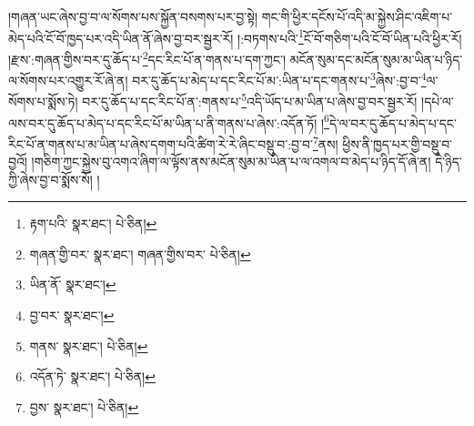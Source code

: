 །གཞན་ཡང་ཞེས་བྱ་བ་ལ་སོགས་པས་སྐྱོན་བསགས་པར་བྱ་སྟེ། གང་གི་ཕྱིར་དངོས་པོ་འདི་མ་སྐྱེས་ཤིང་འཇིག་པ་མེད་པའི་ངོ་བོ་ཁྱད་པར་འདི་ཡིན་ནོ་ཞེས་བྱ་བར་སྦྱར་རོ། །:བཏགས་པའི་\footnote{རྟག་པའི་  སྣར་ཐང་།  པེ་ཅིན། }ངོ་བོ་གཅིག་པའི་ངོ་བོ་ཡིན་པའི་ཕྱིར་རོ། །རྫས་:གཞན་གྱིས་བར་དུ་ཆོད་པ་\footnote{གཞན་གྱི་བར་  སྣར་ཐང་། གཞན་གྱིས་བར་  པེ་ཅིན། }དང་རིང་པོ་ན་གནས་པ་དག་ཀྱང་། མངོན་སུམ་དང་མངོན་སུམ་མ་ཡིན་པ་ཉིད་ལ་སོགས་པར་འགྱུར་རོ་ཞེ་ན། བར་དུ་ཆོད་པ་མེད་པ་དང་རིང་པོ་མ་:ཡིན་པ་དང་གནས་པ་\footnote{ཡིན་ནོ་  སྣར་ཐང་། }ཞེས་:བྱ་བ་\footnote{བྱ་བར་  སྣར་ཐང་། }ལ་སོགས་པ་སྨོས་ཏེ། བར་དུ་ཆོད་པ་དང་རིང་པོ་ན་:གནས་པ་\footnote{གནས་  སྣར་ཐང་།  པེ་ཅིན། }འདི་ཡོད་པ་མ་ཡིན་པ་ཞེས་བྱ་བར་སྦྱར་རོ། །དཔེ་ལ་ལས་བར་དུ་ཆོད་པ་མེད་པ་དང་རིང་པོ་མ་ཡིན་པ་ནི་གནས་པ་ཞེས་:འདོན་ཏོ། །\footnote{འདོན་ཏེ་  སྣར་ཐང་།  པེ་ཅིན། }དེ་ལ་བར་དུ་ཆོད་པ་མེད་པ་དང་རིང་པོ་ན་གནས་པ་མ་ཡིན་པ་ཞེས་དགག་པའི་ཚིག་རེ་རེ་ཞིང་བསྡུ་བ་:བྱ་བ་\footnote{བྱས་  སྣར་ཐང་།  པེ་ཅིན། }ནས། ཕྱིས་ནི་ཁྱད་པར་གྱི་བསྡུ་བ་བྱའོ། །གཅིག་ཀྱང་སྐྱེས་བུ་འགའ་ཞིག་ལ་ལྟོས་ནས་མངོན་སུམ་མ་ཡིན་པ་ལ་འགལ་བ་མེད་པ་ཉིད་དོ་ཞེ་ན། དེ་ཉིད་ཀྱི་ཞེས་བྱ་བ་སྨོས་སོ། །
